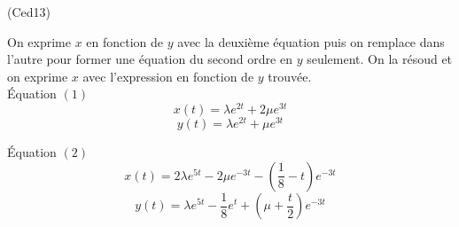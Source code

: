 \begin{tiny}(Ced13)\end{tiny} On exprime $x$ en fonction de $y$ avec la deuxième équation puis on remplace dans l'autre pour former une équation du second ordre en $y$ seulement. On la résoud et on exprime $x$ avec l'expression en fonction de $y$ trouvée.\\
\'Equation $(1)$
\begin{displaymath}
x(t) = \lambda e^{2t} +2\mu e^{3t}
\end{displaymath}
\begin{displaymath}
 y(t) = \lambda e^{2t} + \mu e^{3t} 
\end{displaymath}

\'Equation $(2)$
\begin{displaymath}
x(t) = 2\lambda e^{5t}-2\mu e^{-3t}-(\frac{1}{8}-t)e^{-3t}
\end{displaymath}
\begin{displaymath}
 y(t) = \lambda e^{5t} -\frac{1}{8}e^t +\left(\mu+\frac{t}{2} \right)e^{-3t} 
\end{displaymath}

